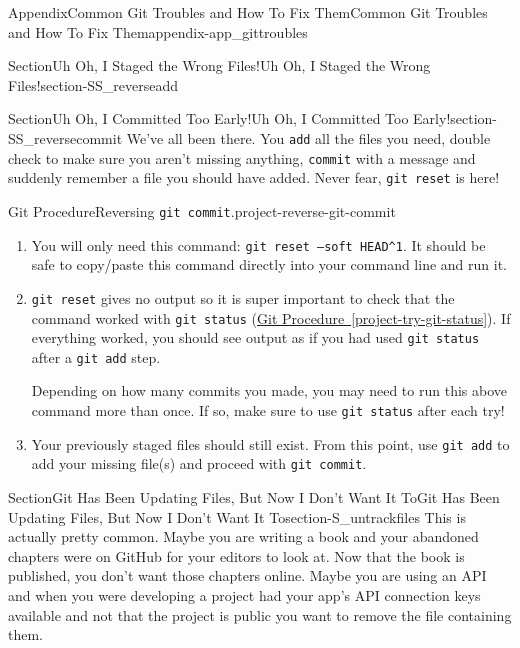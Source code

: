 \documentclass[oneside,10pt,]{book}
\newcommand{\xreffont}{\relax}
\newcommand{\mono}[1]{\texttt{#1}}
\begin{document}
\begin{appendixptx}{Appendix}{Common Git Troubles and How To Fix Them}{}{Common Git Troubles and How To Fix Them}{}{}{appendix-app_gittroubles}
\begin{sectionptx}{Section}{Uh Oh, I Staged the Wrong Files!}{}{Uh Oh, I Staged the Wrong Files!}{}{}{section-SS_reverseadd}
\end{sectionptx}
%
%
\typeout{************************************************}
\typeout{************************************************}
%
\begin{sectionptx}{Section}{Uh Oh, I Committed Too Early!}{}{Uh Oh, I Committed Too Early!}{}{}{section-SS_reversecommit}
%
%
We've all been there. You \mono{add} all the files you need, double check to make sure you aren't missing anything, \mono{commit} with a message and suddenly remember a file you should have added. Never fear, \mono{git reset} is here!%
\begin{project}{Git Procedure}{Reversing \mono{git commit}.}{project-reverse-git-commit}%
\begin{enumerate}[font=\bfseries,label=(\alph*),ref=\alph*]%
\item{}You will only need this command: \mono{git reset --soft HEAD\textasciicircum{}1}. It should be safe to copy\slash{}paste this command directly into your command line and run it.%
\item{}\mono{git reset} gives no output so it is super important to check that the command worked with \mono{git status} (\hyperref[project-try-git-status]{Git Procedure~{\xreffont\ref{project-try-git-status}}}). If everything worked, you should see output as if you had used \mono{git status} after a \mono{git add} step.%
\par
Depending on how many commits you made, you may need to run this above command more than once. If so, make sure to use \mono{git status} after each try!%
\item{}Your previously staged files should still exist. From this point, use \mono{git add} to add your missing file(s) and proceed with \mono{git commit}.%
\end{enumerate}%
\end{project}%
\end{sectionptx}
%
%
\typeout{************************************************}
\typeout{************************************************}
%
\begin{sectionptx}{Section}{Git Has Been Updating Files, But Now I Don't Want It To}{}{Git Has Been Updating Files, But Now I Don't Want It To}{}{}{section-S_untrackfiles}
%
%
This is actually pretty common. Maybe you are writing a book and your abandoned chapters were on GitHub for your editors to look at. Now that the book is published, you don't want those chapters online. Maybe you are using an API and when you were developing a project had your app's API connection keys available and not that the project is public you want to remove the file containing them.%

\end{sectionptx}
\end{appendixptx}
\end{document}
